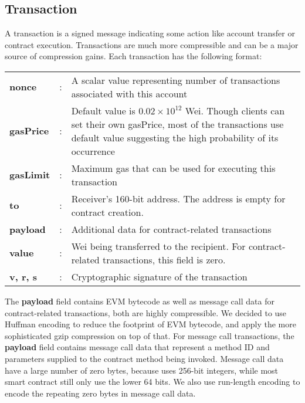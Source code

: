 \subsection{Transaction}

A transaction is a signed message indicating some action like account transfer or contract execution.
Transactions are much more compressible and can be a major source of compression gains.
Each transaction has the following format:

\begin{table}[H]
	\centering
	\begin{tabular}{>{\bfseries}l c p{}}
  nonce&:& A scalar value representing number of transactions associated with this account\\
	gasPrice&:& \par{Default value is $0.02\times10^{12}$ Wei. Though clients can set their own gasPrice, most of the transactions use default value suggesting the high probability of its occurrence} \\
  gasLimit&:& Maximum gas that can be used for executing this transaction\\
  to&:& Receiver's 160-bit address. The address is empty for contract creation.\\
  payload&:& Additional data for contract-related transactions\\
  value&:& Wei being transferred to the recipient. For contract-related transactions, this field is zero.\\
  v, r, s&:& Cryptographic signature of the transaction\\
\end{tabular}
\end{table}

The \textbf{payload} field contains EVM bytecode as well as message call data for contract-related transactions,
both are highly compressible. We decided to use Huffman encoding to reduce the footprint of EVM bytecode,
and apply the more sophisticated gzip compression on top of that.
For message call transactions, the \textbf{payload} field contains message call data that represent a method ID and
parameters supplied to the contract method being invoked.
Message call data have a large number of zero bytes, because \eth{} uses 256-bit integers,
while most smart contract still only use the lower 64 bits.
We also use run-length encoding to encode the repeating zero bytes in message call data.

